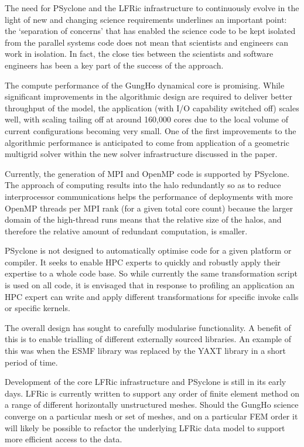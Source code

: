 \documentclass[review,times]{elsarticle}
\begin{document}
The need for PSyclone and the LFRic infrastructure to continuously
evolve in the light of new and changing science requirements
underlines an important point: the `separation of concerns' that has
enabled the science code to be kept isolated from the parallel systems
code does not mean that scientists and engineers can work in
isolation. In fact, the close ties between the scientists and software
engineers has been a key part of the success of the approach.

The compute performance of the GungHo dynamical core is promising. While
significant improvements in the algorithmic design are required to
deliver better throughput of the model, the application (with I/O
capability switched off) scales well, with scaling tailing off at
around 160,000 cores due to the local volume of current configurations
becoming very small. One of the first improvements to the algorithmic
performance is anticipated to come from application of a geometric
multigrid solver within the new solver infrastructure discussed in the paper.

Currently, the generation of MPI and OpenMP code is supported by PSyclone.
The approach of computing results into the halo redundantly so as to reduce
interprocessor communications helps the performance of deployments with more
OpenMP threads per MPI rank (for a given total core count) because the
larger domain of the high-thread runs means that the relative size of the
halos, and therefore the relative amount of redundant computation, is smaller.

PSyclone is not designed to automatically optimise code for a given
platform or compiler. It seeks to enable HPC experts to quickly and
robustly apply their expertise to a whole code base. So while
currently the same transformation script is used on all code, it is
envisaged that in response to profiling an application an HPC expert
can write and apply different transformations for specific invoke
calls or specific kernels.

The overall design has sought to carefully modularise functionality. A
benefit of this is to enable trialling of different externally sourced
libraries. An example of this was when the ESMF library was replaced by the
YAXT library in a short period of time.

Development of the core LFRic infrastructure and PSyclone is still in
its early days. LFRic is currently written to support any order of finite
element method on a range of different horizontally unstructured meshes.
Should the GungHo science converge on a particular mesh or set of meshes,
and on a particular FEM order it will likely be possible to refactor the
underlying LFRic data model to support more efficient access to the
data.
\end{document}
